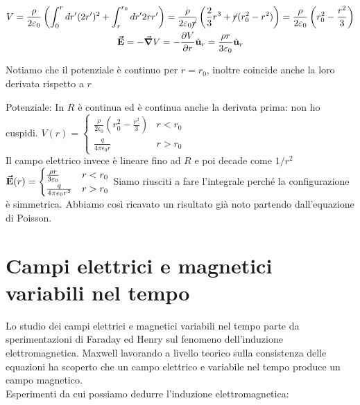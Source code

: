 \begin{examplewt}
\begin{itemize}
		\begin{gather*}
			V=\frac{\rho}{2\varepsilon_0}\left( \int^r_0 dr'(2r')^2 + \int^{r_0}_r dr' 2rr' \right)= \frac{\rho}{2\varepsilon_0 \cancel r} \left( \frac{2}{3} r^3 + \cancel r (r_0^2 -r^2) \right)=\frac{\rho}{2\varepsilon_0}\left( r_0^2 -\frac{r^2}{3} \right)\\
			\vb*{\va{E}}=-\grad V= -\pdv{V}{r}\hat{\mathbf{u}}_r =\frac{\rho r}{3\varepsilon_0}\hat{\mathbf{u}}_r
		\end{gather*}
	\end{itemize}
	Notiamo che il potenziale è continuo per $r=r_0$, inoltre coincide anche la loro derivata rispetto a $r$
	
	Potenziale:	In $R$ è continua ed è continua anche la derivata prima: non ho cuspidi. 
	$V(r)=\begin{cases}
		\frac{\rho}{2\epsilon_0}(r_0^2 -\frac{r^2}{3}) & r<r_0\\
		\frac{q}{4\pi\epsilon_0 r} &r>r_0
	\end{cases}$\\
	Il campo elettrico invece è lineare fino ad $R$ e poi decade come $1/r^2$
	$\vb*{\va{E}}(r)=\begin{cases}
		\frac{\rho r}{3\varepsilon_0} & r<r_0\\
		\frac{q}{4\pi\varepsilon_0 r^2} & r>r_0
	\end{cases}$
	Siamo riusciti a fare l'integrale perché la configurazione è simmetrica. Abbiamo così ricavato un risultato già noto partendo dall'equazione di Poisson.
\end{examplewt}



\section{Campi elettrici e magnetici variabili nel tempo}
Lo studio dei campi elettrici e magnetici variabili nel tempo parte da sperimentazioni di Faraday ed Henry sul fenomeno dell'induzione elettromagnetica. Maxwell lavorando a livello teorico sulla consistenza delle equazioni ha scoperto che un campo elettrico e variabile nel tempo produce un campo magnetico.\\
Esperimenti da cui possiamo dedurre l'induzione elettromagnetica:

